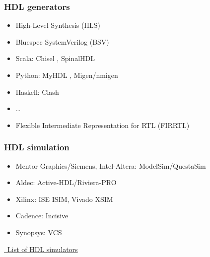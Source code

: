 \documentclass{beamer}
\begin{document}
\begin{frame}
\frametitle{HDL generators}
\begin{itemize}
\item High-Level Synthesis (HLS)
\href{https://en.wikipedia.org/wiki/High-level_synthesis}{\faWikipediaW}

\item Bluespec SystemVerilog (BSV) \href{https://bluespec.com/}{\faGlobe}
\href{https://github.com/bluespec}{\faGithub} \href{https://github.com/B-Lang-org/bsc}{\faGit}

\item Scala:
Chisel
\href{https://www.chisel-lang.org/}{\faGlobe} \href{https://github.com/freechipsproject/chisel3}{\faGithub},
SpinalHDL
\href{https://github.com/SpinalHDL}{\faGithub} \href{https://spinalhdl.github.io/SpinalDoc-RTD/}{\faBook}

\item Python:
MyHDL
\href{http://www.myhdl.org/}{\faGlobe} \href{https://github.com/myhdl/myhdl}{\faGithub},
Migen/nmigen
\href{https://m-labs.hk/gateware/migen/}{\faGlobe}
\href{https://github.com/m-labs?type=source}{\faGithub}
\item Haskell:
Clash
\href{https://clash-lang.org/}{\faGlobe}
\href{https://github.com/clash-lang}{\faGithub}

\item \ldots
\end{itemize}
\vspace{2em}
\begin{itemize}
\item Flexible Intermediate Representation for RTL (FIRRTL)
\href{https://github.com/freechipsproject/firrtl}{\faGithub}
\href{https://freechipsproject.github.io/firrtl/}{\faBook}
\end{itemize}
\end{frame}

\begin{frame}
\frametitle{HDL simulation}
\vfill
\begin{itemize}
\item Mentor Graphics/Siemens, Intel-Altera: ModelSim/QuestaSim
\item Aldec: Active-HDL/Riviera-PRO
\item Xilinx: ISE ISIM, Vivado XSIM
\item Cadence: Incisive
\item Synopsys: VCS
\end{itemize}
\vfill
\centering
\href{https://en.wikipedia.org/wiki/List_of_HDL_simulators}{\faWikipediaW~List of HDL simulators}
\end{frame}
\end{document}
